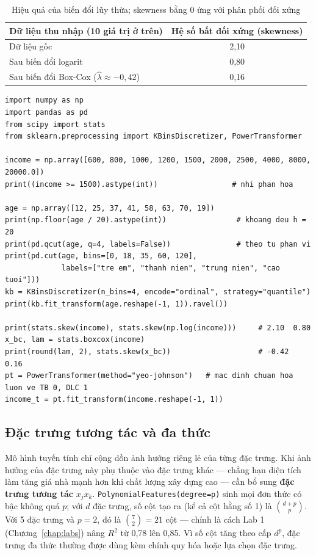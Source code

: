 \begin{table}[H]
\centering
\begin{tabular}{|l|c|}
\hline
\textbf{Dữ liệu thu nhập (10 giá trị ở trên)} & \textbf{Hệ số bất đối xứng (skewness)} \\
\hline
Dữ liệu gốc & 2,10 \\ \hline
Sau biến đổi logarit & 0,80 \\ \hline
Sau biến đổi Box-Cox ($\hat{\lambda} \approx -0{,}42$) & 0,16 \\ \hline
\end{tabular}
\caption{Hiệu quả của biến đổi lũy thừa; skewness bằng 0 ứng với phân phối đối xứng}
\label{tab:power-transform}
\end{table}

\begin{lstlisting}[caption={Nhị phân hóa, rời rạc hóa và biến đổi lũy thừa}]
import numpy as np
import pandas as pd
from scipy import stats
from sklearn.preprocessing import KBinsDiscretizer, PowerTransformer

income = np.array([600, 800, 1000, 1200, 1500, 2000, 2500, 4000, 8000, 20000.0])
print((income >= 1500).astype(int))                 # nhi phan hoa

age = np.array([12, 25, 37, 41, 58, 63, 70, 19])
print(np.floor(age / 20).astype(int))                # khoang deu h = 20
print(pd.qcut(age, q=4, labels=False))               # theo tu phan vi
print(pd.cut(age, bins=[0, 18, 35, 60, 120],
             labels=["tre em", "thanh nien", "trung nien", "cao tuoi"]))
kb = KBinsDiscretizer(n_bins=4, encode="ordinal", strategy="quantile")
print(kb.fit_transform(age.reshape(-1, 1)).ravel())

print(stats.skew(income), stats.skew(np.log(income)))     # 2.10  0.80
x_bc, lam = stats.boxcox(income)
print(round(lam, 2), stats.skew(x_bc))                    # -0.42  0.16
pt = PowerTransformer(method="yeo-johnson")   # mac dinh chuan hoa luon ve TB 0, DLC 1
income_t = pt.fit_transform(income.reshape(-1, 1))
\end{lstlisting}

\subsection{Đặc trưng tương tác và đa thức}

Mô hình tuyến tính chỉ cộng dồn ảnh hưởng riêng lẻ của từng đặc trưng. Khi ảnh hưởng của đặc trưng này phụ thuộc vào đặc trưng khác --- chẳng hạn diện tích làm tăng giá nhà mạnh hơn khi chất lượng xây dựng cao --- cần bổ sung \textbf{đặc trưng tương tác} $x_j x_k$. \texttt{PolynomialFeatures(degree=p)} sinh mọi đơn thức có bậc không quá $p$; với $d$ đặc trưng, số cột tạo ra (kể cả cột hằng số 1) là $\binom{d + p}{p}$. Với 5 đặc trưng và $p = 2$, đó là $\binom{7}{2} = 21$ cột --- chính là cách Lab 1 (Chương~\ref{chap:labs}) nâng $R^2$ từ 0,78 lên 0,85. Vì số cột tăng theo cấp $d^p$, đặc trưng đa thức thường được dùng kèm chính quy hóa hoặc lựa chọn đặc trưng.

